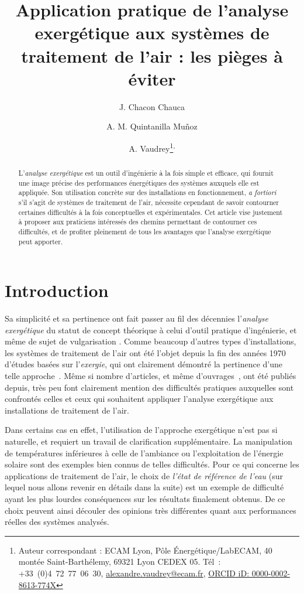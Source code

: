 \documentclass[a4paper,11pt]{scrartcl}
\title{Application pratique de l'analyse exergétique aux systèmes de traitement
de l'air : les pièges à éviter}
\author[1,2]{J. Chacon Chauca}
\author[3]{A. M. Quintanilla Muñoz}
\author[1,2]{A. Vaudrey\thanks{Auteur correspondant : ECAM Lyon, Pôle Énergétique/LabECAM, 40 montée Saint-Barthélemy, 69321 Lyon CEDEX 05. Tél : +33 (0)4 72 77 06 30, \href{mailto:alexandre.vaudrey@ecam.fr}{alexandre.vaudrey@ecam.fr}, \href{http://orcid.org/0000-0002-8613-774X}{ORCID iD: 0000-0002-8613-774X}}\textsuperscript{,}}
\affil[1]{Université de Lyon, ECAM Lyon, INSA-Lyon, LabECAM, F-69005, France.}
\affil[2]{Pontificia Universidad Cat\'olica del Per\'u (PUCP), Laboratorio
de Energ\'ia, Lima, Pérou.}
\affil[3]{Département Énergie, Institut FEMTO-ST, UMR 6174, CNRS, Université de Bourgogne Franche-Comté, Belfort, France.}
\begin{document}
\maketitle

\begin{abstract}
	L'\emph{analyse exergétique} est un outil d'ingénierie à la fois simple
	et efficace, qui fournit une image précise des performances énergétiques
	des systèmes auxquels elle est appliquée. Son utilisation concrète sur
	des installations en fonctionnement, \textsl{a fortiori} s'il s'agit de
	systèmes de traitement de l'air, nécessite cependant de savoir
	contourner certaines difficultés à la fois conceptuelles et
	expérimentales. Cet article vise justement à proposer aux praticiens
	intéressés des chemins permettant de contourner ces difficultés, et de
	profiter pleinement de tous les avantages que l'analyse exergétique peut
	apporter.
\end{abstract}

\tableofcontents

\section{Introduction}

Sa simplicité et sa pertinence ont fait passer au fil des décennies
l'\emph{analyse exergétique} du statut de concept théorique à celui d'outil
pratique d'ingénierie, et même de sujet de vulgarisation \cite{SV-2013}. Comme
beaucoup d'autres types d'installations, les systèmes de traitement de l'air ont
été l'objet depuis la fin des années 1970 d'études basées sur l'\emph{exergie},
qui ont clairement démontré la pertinence d'une telle
approche~\cite{Gaggioli-1978,ASHRAE-1979,ECM-021-0065}. Même si nombre
d'articles, et même d'ouvrages~\cite{Dincer-2015}, ont été publiés depuis, très
peu font clairement mention des difficultés pratiques auxquelles sont confrontés
celles et ceux qui souhaitent appliquer l'analyse exergétique aux installations
de traitement de l'air.

Dans certains cas en effet, l'utilisation de l'approche exergétique n’est pas si
naturelle, et requiert un travail de clarification supplémentaire. La
manipulation de températures inférieures à celle de l’ambiance
\cite{RGT-035-0651} ou l’exploitation de l’énergie solaire \cite{EPL-104-40008}
sont des exemples bien connus de telles difficultés. Pour ce qui concerne les
applications de traitement de l’air, le choix de \emph{l’état de référence de
l’eau} (sur lequel nous allons revenir en détails dans la suite) est un exemple
de difficulté ayant les plus lourdes conséquences sur les résultats finalement
obtenus. De ce choix peuvent ainsi découler des opinions très différentes quant
aux performances réelles des systèmes analysés. 
\end{document}

